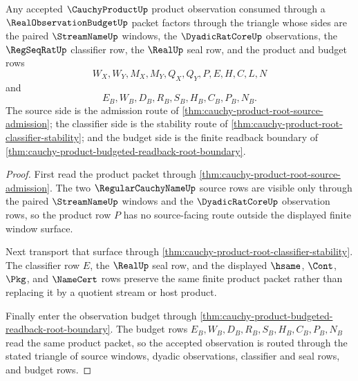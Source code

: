 \begin{theorem}
\label{thm:cauchy-product-observation-budget-triangle}
Any accepted $\CauchyProductUp$ product observation consumed through a $\RealObservationBudgetUp$ packet factors through the triangle whose sides are the paired $\StreamNameUp$ windows, the $\DyadicRatCoreUp$ observations, the $\RegSeqRatUp$ classifier row, the $\RealUp$ seal row, and the product and budget rows
$$
W_X,W_Y,M_X,M_Y,Q_X,Q_Y,P,E,H,C,L,N
$$
and
$$
E_B,W_B,D_B,R_B,S_B,H_B,C_B,P_B,N_B.
$$
The source side is the admission route of \autoref{thm:cauchy-product-root-source-admission}; the classifier side is the stability route of \autoref{thm:cauchy-product-root-classifier-stability}; and the budget side is the finite readback boundary of \autoref{thm:cauchy-product-budgeted-readback-root-boundary}.
\end{theorem}
\begin{proof}
First read the product packet through \autoref{thm:cauchy-product-root-source-admission}. The two $\RegularCauchyNameUp$ source rows are visible only through the paired $\StreamNameUp$ windows and the $\DyadicRatCoreUp$ observation rows, so the product row $P$ has no source-facing route outside the displayed finite window surface.

Next transport that surface through \autoref{thm:cauchy-product-root-classifier-stability}. The classifier row $E$, the $\RealUp$ seal row, and the displayed $\hsame$, $\Cont$, $\Pkg$, and $\NameCert$ rows preserve the same finite product packet rather than replacing it by a quotient stream or host product.

Finally enter the observation budget through \autoref{thm:cauchy-product-budgeted-readback-root-boundary}. The budget rows $E_B,W_B,D_B,R_B,S_B,H_B,C_B,P_B,N_B$ read the same product packet, so the accepted observation is routed through the stated triangle of source windows, dyadic observations, classifier and seal rows, and budget rows.
\end{proof}

